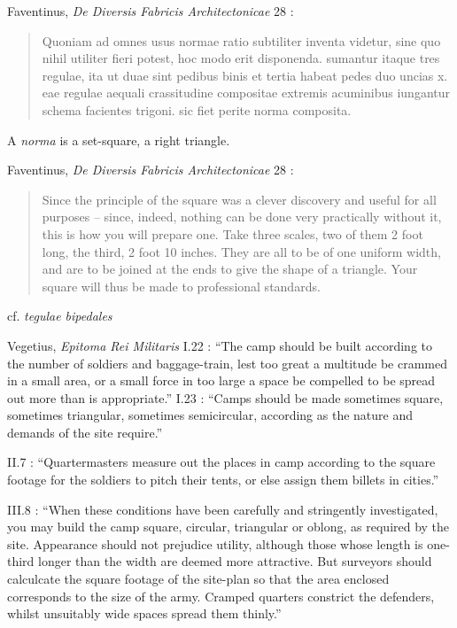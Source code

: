 \documentclass{article}
\theoremstyle{definition}
\begin{document}
Faventinus, {\em De Diversis Fabricis Architectonicae} 28 \cite[p.~80]{plommer}:

\begin{quote}
Quoniam ad omnes usus normae ratio subtiliter inventa videtur, sine quo nihil utiliter fieri potest, hoc modo erit disponenda. sumantur itaque tres regulae, ita ut duae
sint pedibus binis et tertia habeat pedes duo uncias x. eae regulae aequali crassitudine compositae extremis acuminibus iungantur schema facientes trigoni. sic
fiet perite norma composita.
\end{quote}

A {\em norma} is a set-square, a right triangle.

Faventinus, {\em De Diversis Fabricis Architectonicae} 28 \cite[p.~81]{plommer}:

\begin{quote}
Since the principle of the square was a clever discovery and useful for all purposes -- since, indeed, nothing can be done very practically without it,
this is how you will prepare one. Take three scales, two of them 2 foot long, the third, 2 foot 10 inches. They are all to be of one uniform width, and are to be joined
at the ends to give the shape of a triangle. Your square will thus be made to professional standards.
\end{quote}

cf. {\em tegulae bipedales}

Vegetius, {\em Epitoma Rei Militaris} 
I.22 \cite[p.~24]{vegetius}: ``The camp should be built according to the number of soldiers and baggage-train, lest too great
a multitude be crammed in a small area, or a small force in too large a space be compelled to be spread
out more than is appropriate.''
I.23 \cite[p.~24]{vegetius}: ``Camps should be made sometimes square, sometimes triangular,
sometimes semicircular, according as the nature and demands of the site require.''

II.7 \cite[pp.~38--39]{vegetius}: ``Quartermasters measure out the places in camp according to the square footage
for the soldiers to pitch their tents, or else assign them billets in cities.''

III.8 \cite[p.~80]{vegetius}: ``When these conditions have been carefully and stringently investigated, you may build
the camp square, circular, triangular or oblong, as required by the site. Appearance should not prejudice utility, although those
whose length is one-third longer than the width are deemed more attractive. But surveyors should calculcate
the square footage of the site-plan so that the area enclosed corresponds to the size of the army. Cramped quarters
constrict the defenders, whilst unsuitably wide spaces spread them thinly.''
\end{document}
